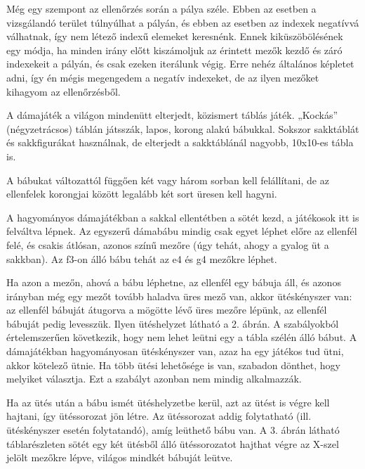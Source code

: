 Még egy szempont az ellenőrzés során a pálya széle. Ebben az esetben a vizsgálandó terület túlnyúlhat a pályán, és ebben az esetben az indexek negatívvá válhatnak, így nem létező indexű elemeket keresnénk. Ennek kiküszöbölésének egy módja, ha minden irány előtt kiszámoljuk az érintett mezők kezdő és záró indexekeit a pályán, és csak ezeken iterálunk végig. Erre nehéz általános képletet adni, így én mégis megengedem a negatív indexeket, de az ilyen mezőket kihagyom az ellenőrzésből.




A dámajáték a világon mindenütt elterjedt, közismert táblás játék. „Kockás” (négyzetrácsos) táblán játsszák, lapos, korong alakú bábukkal. Sokszor sakktáblát és sakkfigurákat használnak, de elterjedt a sakktáblánál nagyobb, 10x10-es tábla is.

A bábukat változattól függően két vagy három sorban kell felállítani, de az ellenfelek korongjai között legalább két sort üresen kell hagyni.

A hagyományos dámajátékban a sakkal ellentétben a sötét kezd, a játékosok itt is felváltva lépnek. Az egyszerű dámabábu mindig csak egyet léphet előre az ellenfél felé, és csakis átlósan, azonos színű mezőre (úgy tehát, ahogy a gyalog üt a sakkban). Az f3-on álló bábu tehát az e4 és g4 mezőkre léphet.

Ha azon a mezőn, ahová a bábu léphetne, az ellenfél egy bábuja áll, és azonos irányban még egy mezőt tovább haladva üres mező van, akkor ütéskényszer van: az ellenfél bábuját átugorva a mögötte lévő üres mezőre lépünk, az ellenfél bábuját pedig levesszük. Ilyen ütéshelyzet látható a 2. ábrán. A szabályokból értelemszerűen következik, hogy nem lehet leütni egy a tábla szélén álló bábut. A dámajátékban hagyományosan ütéskényszer van, azaz ha egy játékos tud ütni, akkor kötelező ütnie. Ha több ütési lehetősége is van, szabadon dönthet, hogy melyiket választja. Ezt a szabályt azonban nem mindig alkalmazzák.

Ha az ütés után a bábu ismét ütéshelyzetbe kerül, azt az ütést is végre kell hajtani, így ütéssorozat jön létre. Az ütéssorozat addig folytatható (ill. ütéskényszer esetén folytatandó), amíg leüthető bábu van. A 3. ábrán látható táblarészleten sötét egy két ütésből álló ütéssorozatot hajthat végre az X-szel jelölt mezőkre lépve, világos mindkét bábuját leütve.

